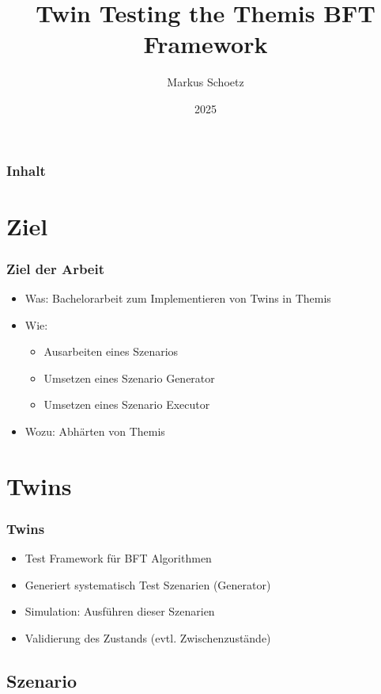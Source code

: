 \documentclass{beamer}
\author{Markus Schoetz}
\title{Twin Testing the Themis BFT Framework}
\institute{C4 - FAU Erlangen}
\date{2025}
\begin{document}
\frame{\titlepage}

\begin{frame}
\frametitle{Inhalt}
\tableofcontents
\end{frame}

\section{Ziel}
\begin{frame}
\frametitle{Ziel der Arbeit}
\begin{itemize}
 \item Was: Bachelorarbeit zum Implementieren von Twins in Themis
 \item Wie:
 \begin{itemize}
  \item Ausarbeiten eines Szenarios
  \item Umsetzen eines Szenario Generator
  \item Umsetzen eines Szenario Executor
 \end{itemize}
 \item Wozu: Abhärten von Themis
\end{itemize}
\end{frame}

\section{Twins}
\begin{frame}
\frametitle{Twins}
 \begin{itemize}
  \item Test Framework für BFT Algorithmen
  \item Generiert systematisch Test Szenarien (Generator)
  \item Simulation: Ausführen dieser Szenarien
  \item Validierung des Zustands (evtl. Zwischenzustände)
 \end{itemize}

\end{frame}

\subsection{Szenario}
\end{document}

